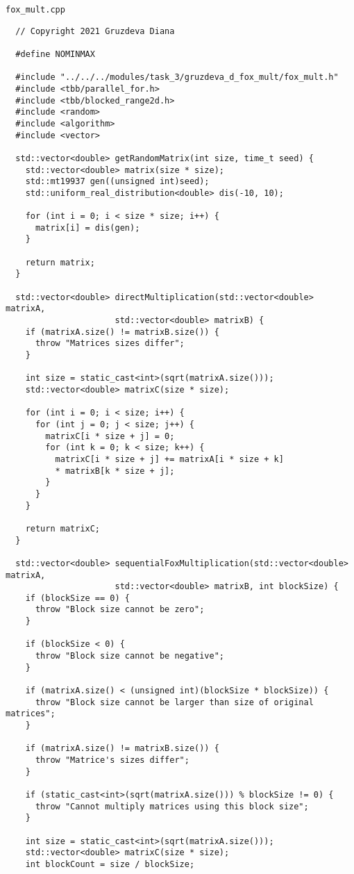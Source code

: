 \documentclass{article}
\begin{document}
\par
\lstinline$fox_mult.cpp$
\begin{lstlisting}
  // Copyright 2021 Gruzdeva Diana

  #define NOMINMAX

  #include "../../../modules/task_3/gruzdeva_d_fox_mult/fox_mult.h"
  #include <tbb/parallel_for.h>
  #include <tbb/blocked_range2d.h>
  #include <random>
  #include <algorithm>
  #include <vector>

  std::vector<double> getRandomMatrix(int size, time_t seed) {
    std::vector<double> matrix(size * size);
    std::mt19937 gen((unsigned int)seed);
    std::uniform_real_distribution<double> dis(-10, 10);

    for (int i = 0; i < size * size; i++) {
      matrix[i] = dis(gen);
    }

    return matrix;
  }

  std::vector<double> directMultiplication(std::vector<double> matrixA,
                      std::vector<double> matrixB) {
    if (matrixA.size() != matrixB.size()) {
      throw "Matrices sizes differ";
    }

    int size = static_cast<int>(sqrt(matrixA.size()));
    std::vector<double> matrixC(size * size);

    for (int i = 0; i < size; i++) {
      for (int j = 0; j < size; j++) {
        matrixC[i * size + j] = 0;
        for (int k = 0; k < size; k++) {
          matrixC[i * size + j] += matrixA[i * size + k]
          * matrixB[k * size + j];
        }
      }
    }

    return matrixC;
  }

  std::vector<double> sequentialFoxMultiplication(std::vector<double> matrixA,
                      std::vector<double> matrixB, int blockSize) {
    if (blockSize == 0) {
      throw "Block size cannot be zero";
    }

    if (blockSize < 0) {
      throw "Block size cannot be negative";
    }

    if (matrixA.size() < (unsigned int)(blockSize * blockSize)) {
      throw "Block size cannot be larger than size of original matrices";
    }

    if (matrixA.size() != matrixB.size()) {
      throw "Matrice's sizes differ";
    }

    if (static_cast<int>(sqrt(matrixA.size())) % blockSize != 0) {
      throw "Cannot multiply matrices using this block size";
    }

    int size = static_cast<int>(sqrt(matrixA.size()));
    std::vector<double> matrixC(size * size);
    int blockCount = size / blockSize;


\end{lstlisting}
\end{document}
